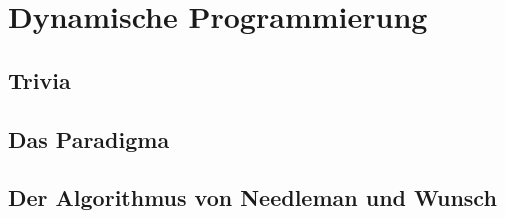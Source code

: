 \chapter{Dynamische Programmierung}
\label{ch:Dynamische Programmierung}

\section{Trivia}

\section{Das Paradigma}

\section{Der Algorithmus von Needleman und Wunsch}
